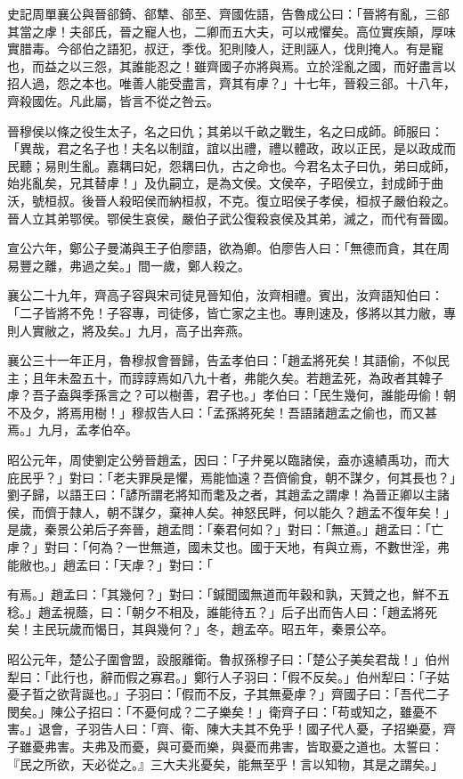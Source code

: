 \begin{pinyinscope}
史記周單襄公與晉郤錡、郤犨、郤至、齊國佐語，告魯成公曰：「晉將有亂，三郤其當之虖！夫郤氏，晉之寵人也，二卿而五大夫，可以戒懼矣。高位實疾顛，厚味實腊毒。今郤伯之語犯，叔迂，季伐。犯則陵人，迂則誣人，伐則掩人。有是寵也，而益之以三怨，其誰能忍之！雖齊國子亦將與焉。立於淫亂之國，而好盡言以招人過，怨之本也。唯善人能受盡言，齊其有虖？」十七年，晉殺三郤。十八年，齊殺國佐。凡此屬，皆言不從之咎云。

晉穆侯以條之役生太子，名之曰仇；其弟以千畝之戰生，名之曰成師。師服曰：「異哉，君之名子也！夫名以制誼，誼以出禮，禮以體政，政以正民，是以政成而民聽；易則生亂。嘉耦曰妃，怨耦曰仇，古之命也。今君名太子曰仇，弟曰成師，始兆亂矣，兄其替虖！」及仇嗣立，是為文侯。文侯卒，子昭侯立，封成師于曲沃，號桓叔。後晉人殺昭侯而納桓叔，不克。復立昭侯子孝侯，桓叔子嚴伯殺之。晉人立其弟鄂侯。鄂侯生哀侯，嚴伯子武公復殺哀侯及其弟，滅之，而代有晉國。

宣公六年，鄭公子曼滿與王子伯廖語，欲為卿。伯廖告人曰：「無德而貪，其在周易豐之離，弗過之矣。」間一歲，鄭人殺之。

襄公二十九年，齊高子容與宋司徒見晉知伯，汝齊相禮。賓出，汝齊語知伯曰：「二子皆將不免！子容專，司徒侈，皆亡家之主也。專則速及，侈將以其力敝，專則人實敝之，將及矣。」九月，高子出奔燕。

襄公三十一年正月，魯穆叔會晉歸，告孟孝伯曰：「趙孟將死矣！其語偷，不似民主；且年未盈五十，而諄諄焉如八九十者，弗能久矣。若趙孟死，為政者其韓子虖？吾子盍與季孫言之？可以樹善，君子也。」孝伯曰：「民生幾何，誰能毋偷！朝不及夕，將焉用樹！」穆叔告人曰：「孟孫將死矣！吾語諸趙孟之偷也，而又甚焉。」九月，孟孝伯卒。

昭公元年，周使劉定公勞晉趙孟，因曰：「子弁冕以臨諸侯，盍亦遠績禹功，而大庇民乎？」對曰：「老夫罪戾是懼，焉能恤遠？吾儕偷食，朝不謀夕，何其長也？」劉子歸，以語王曰：「諺所謂老將知而耄及之者，其趙孟之謂虖！為晉正卿以主諸侯，而儕于隸人，朝不謀夕，棄神人矣。神怒民畔，何以能久？趙孟不復年矣！」是歲，秦景公弟后子奔晉，趙孟問：「秦君何如？」對曰：「無道。」趙孟曰：「亡虖？」對曰：「何為？一世無道，國未艾也。國于天地，有與立焉，不數世淫，弗能敝也。」趙孟曰：「天虖？」對曰：「

有焉。」趙孟曰：「其幾何？」對曰：「鍼聞國無道而年穀和孰，天贊之也，鮮不五稔。」趙孟視蔭，曰：「朝夕不相及，誰能待五？」后子出而告人曰：「趙孟將死矣！主民玩歲而愒日，其與幾何？」冬，趙孟卒。昭五年，秦景公卒。

昭公元年，楚公子圍會盟，設服離衛。魯叔孫穆子曰：「楚公子美矣君哉！」伯州犁曰：「此行也，辭而假之寡君。」鄭行人子羽曰：「假不反矣。」伯州犁曰：「子姑憂子晢之欲背誕也。」子羽曰：「假而不反，子其無憂虖？」齊國子曰：「吾代二子閔矣。」陳公子招曰：「不憂何成？二子樂矣！」衛齊子曰：「苟或知之，雖憂不害。」退會，子羽告人曰：「齊、衛、陳大夫其不免乎！國子代人憂，子招樂憂，齊子雖憂弗害。夫弗及而憂，與可憂而樂，與憂而弗害，皆取憂之道也。太誓曰：『民之所欲，天必從之。』三大夫兆憂矣，能無至乎！言以知物，其是之謂矣。」


\end{pinyinscope}
